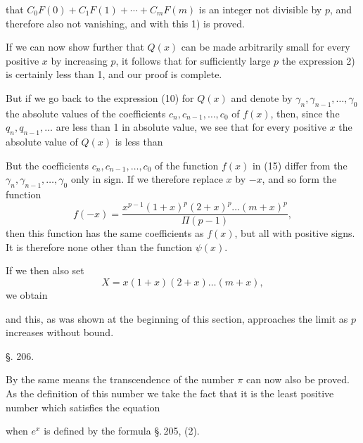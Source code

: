 that $C_0 F(0) + C_1 F(1) + \cdots + C_m F(m)$ is an integer not divisible by $p$, and therefore also not vanishing, and with this 1) is proved.

If we can now show further that $Q(x)$ can be made arbitrarily small for every positive $x$ by increasing $p$, it follows that for sufficiently large $p$ the expression 2) is certainly less than 1, and our proof is complete.

But if we go back to the expression (10) for $Q(x)$ and denote by $\gamma_n, \gamma_{n-1}, \ldots, \gamma_0$ the absolute values of the coefficients $c_n, c_{n-1}, \ldots, c_0$ of $f(x)$, then, since the $q_n, q_{n-1}, \ldots$ are less than 1 in absolute value, we see that for every positive $x$ the absolute value of $Q(x)$ is less than


But the coefficients $c_n, c_{n-1}, \ldots, c_0$ of the function $f(x)$ in (15) differ from the $\gamma_n, \gamma_{n-1}, \ldots, \gamma_0$ only in sign. If we therefore replace $x$ by $-x$, and so form the function
\[
f(-x) = \frac{x^{p-1}(1+x)^p(2+x)^p\ldots(m+x)^p}{\Pi(p-1)},
\]
then this function has the same coefficients as $f(x)$, but all with positive signs. It is therefore none other than the function $\psi(x)$.

If we then also set
\[
X = x(1+x)(2+x)\ldots(m+x),
\]
we obtain


and this, as was shown at the beginning of this section, approaches the limit  as $p$ increases without bound.


\begin{center}
§. 206.

\end{center}

By the same means the transcendence of the number $\pi$ can now also be proved. As the definition of this number we take the fact that it is the least positive number which satisfies the equation


when $e^x$ is defined by the formula \S.\,205, (2).
